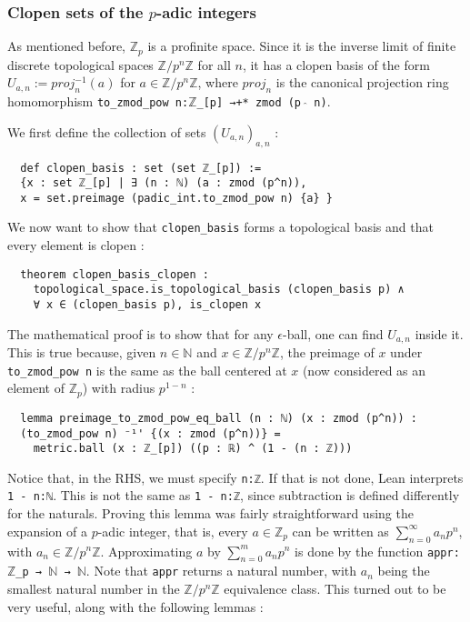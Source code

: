 \documentclass[a4paper,UKenglish,cleveref, autoref, thm-restate]{lipics-v2021}
\newcommand{\lean}[1]{\texttt{#1}\xspace} %
\begin{document}
\subsubsection{Clopen sets of the $p$-adic integers}
As mentioned before, $\mathbb{Z}_p$ is a profinite space. Since it is the inverse limit of finite
discrete topological spaces $\mathbb{Z}/p^n \mathbb{Z}$ for all $n$, it has a clopen basis of the
form $U_{a,n} := proj_n ^{-1} (a)$ for $a \in \mathbb{Z}/p^n \mathbb{Z}$, where $proj_n$ is the
canonical projection ring homomorphism \lean{to\_zmod\_pow n:$\mathbb{Z}$\_[p] →+* zmod (p $\hat{}$ n)}. 

We first define the collection of sets $(U_{a,n})_{a,n}$ :
\begin{lstlisting}
  def clopen_basis : set (set ℤ_[p]) := 
  {x : set ℤ_[p] | ∃ (n : ℕ) (a : zmod (p^n)),
  x = set.preimage (padic_int.to_zmod_pow n) {a} }
\end{lstlisting}

We now want to show that \lean{clopen\_basis} forms a topological basis and that every element is
clopen :
\begin{lstlisting}
  theorem clopen_basis_clopen : 
    topological_space.is_topological_basis (clopen_basis p) ∧
    ∀ x ∈ (clopen_basis p), is_clopen x
\end{lstlisting}
The mathematical proof is to show that for any $\epsilon$-ball, one can find $U_{a,n}$ inside it.
This is true because, given $n \in \mathbb{N}$ and $x \in \mathbb{Z} / p^n \mathbb{Z}$, the preimage of $x$ 
under \lean{to\_zmod\_pow n} is the same as the ball centered at $x$ (now considered as an element of $\mathbb{Z}_p$) with radius $p^{1 - n}$ :
\begin{lstlisting}
  lemma preimage_to_zmod_pow_eq_ball (n : ℕ) (x : zmod (p^n)) : 
  (to_zmod_pow n) ⁻¹' {(x : zmod (p^n))} = 
    metric.ball (x : ℤ_[p]) ((p : ℝ) ^ (1 - (n : ℤ)))
\end{lstlisting}

Notice that, in the RHS, we must specify \lean{n:ℤ}. If that is not done, Lean interprets \lean{1 - n:ℕ}. This is not the same as 
\lean{1 - n:ℤ}, since subtraction is defined differently for the naturals. 
Proving this lemma was fairly straightforward using the expansion of a $p$-adic integer, that is, every
$a \in \mathbb{Z}_p$ can be written as $\sum_{n = 0}^{\infty} a_n p^n$, with $a_n \in \mathbb{Z}/p^n \mathbb{Z}$.
Approximating $a$ by $\sum_{n = 0}^{m} a_n p^n$ is done by the function \lean{appr:$\mathbb{Z}$\_p → $\mathbb{N}$ → $\mathbb{N}$}.
Note that \lean{appr} returns a natural number, with $a_n$ being the smallest natural number in the
$\mathbb{Z}/p^n \mathbb{Z}$ equivalence class. This turned out to be very useful, along with the
following lemmas :
\end{document}
